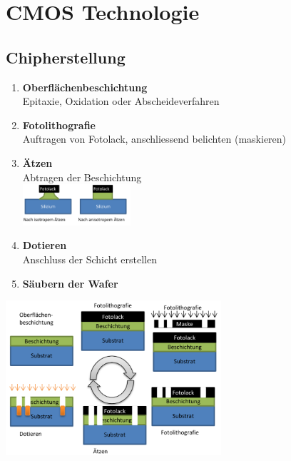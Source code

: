 \section{CMOS Technologie}
\subsection{Chipherstellung}
\begin{minipage}{10cm}
	\begin{enumerate}
	  \item \textbf{Oberflächenbeschichtung} \\
	  	Epitaxie, Oxidation oder Abscheideverfahren
	  \item \textbf{Fotolithografie} \\
	  	Auftragen von Fotolack, anschliessend belichten (maskieren)
	  \item \textbf{Ätzen} \\
	  	Abtragen der Beschichtung \\
	  	\includegraphics[width=4cm]{images/Aetzen_Isotrop_Anisotrop.png}
	  \item \textbf{Dotieren} \\
	  	Anschluss der Schicht erstellen
	  \item \textbf{Säubern der Wafer}
	\end{enumerate}
\end{minipage}
\begin{minipage}{8cm}
	\includegraphics[width=8cm]{images/Chip_Herstellung.png}
\end{minipage}
